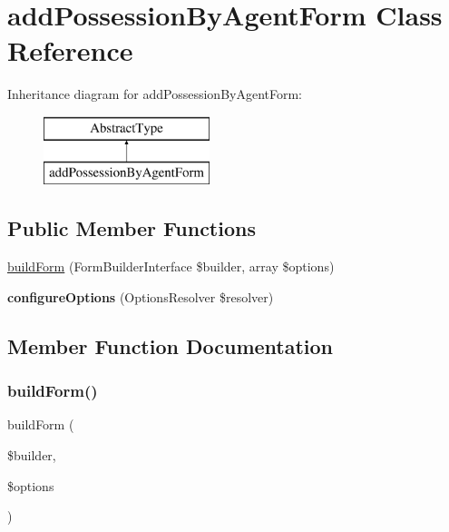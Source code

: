 \hypertarget{class_app_1_1_forms_1_1add_possession_by_agent_form}{}\section{add\+Possession\+By\+Agent\+Form Class Reference}
\label{class_app_1_1_forms_1_1add_possession_by_agent_form}
Inheritance diagram for add\+Possession\+By\+Agent\+Form\+:\begin{figure}[H]
\begin{center}
\leavevmode
\includegraphics[height=2.000000cm]{class_app_1_1_forms_1_1add_possession_by_agent_form}
\end{center}
\end{figure}
\subsection*{Public Member Functions}
\begin{DoxyCompactItemize}
\item 
\mbox{\hyperlink{class_app_1_1_forms_1_1add_possession_by_agent_form_a83c3745710374f9c5a1eb0686fe2dfab}{build\+Form}} (Form\+Builder\+Interface \$builder, array \$options)
\item 
\mbox{\label{class_app_1_1_forms_1_1add_possession_by_agent_form_a8ff68a86f5090b5df973286836e46ead}} 
{\bfseries configure\+Options} (Options\+Resolver \$resolver)
\end{DoxyCompactItemize}


\subsection{Member Function Documentation}
\mbox{\label{class_app_1_1_forms_1_1add_possession_by_agent_form_a83c3745710374f9c5a1eb0686fe2dfab}} 
\subsubsection{\texorpdfstring{buildForm()}{buildForm()}}
{\footnotesize\ttfamily build\+Form (\begin{DoxyParamCaption}\item[{Form\+Builder\+Interface}]{\$builder,  }\item[{array}]{\$options }\end{DoxyParamCaption})}


